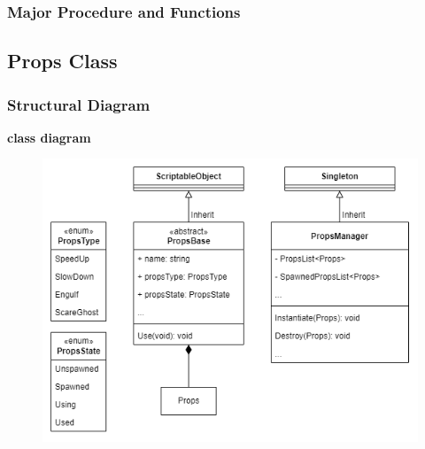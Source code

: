 \documentclass[11pt]{article}
\begin{document}
\subsubsection{Major Procedure and Functions}

\subsection{Props Class}
\subsubsection{Structural Diagram}
\textbf{class diagram}\\
\begin{figure}[H]
    \centering
    \includegraphics*[scale=0.4]{Props-Class.png}
\end{figure}
\end{document}
